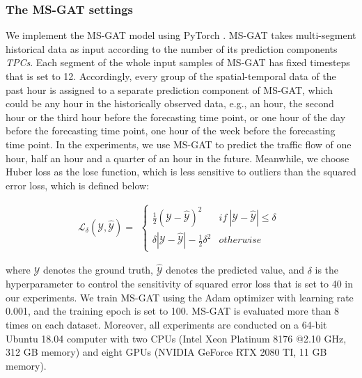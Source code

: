 \subsubsection{The MS-GAT settings}
We implement the MS-GAT model using PyTorch \cite{ketkar2017introduction}. MS-GAT takes multi-segment historical data as input according to the number of its prediction components  \textit{TPCs}. Each segment of the whole input samples of MS-GAT has fixed timesteps that is set to 12. Accordingly, every group of the spatial-temporal data of the past hour is assigned to a separate prediction component of MS-GAT, which could be any hour in the historically observed data, e.g., an hour, the second hour or the third hour before the forecasting time point, or one hour of the day before the forecasting time point, one hour of the week before the forecasting time point. In the experiments, we use MS-GAT to predict the traffic flow of one hour, half an hour and a quarter of an hour in the future. Meanwhile, we choose Huber loss \cite{huber1992robust} as the lose function, which is less sensitive to outliers than the squared error loss, which is defined below:

\begin{equation}
    \label{eqn:huber_loss}
    \mathcal{L}_{\delta}(\mathcal{Y}, \hat{\mathcal{Y}}) =
    \begin{aligned}
        \begin{cases}
            \frac{1}{2} \left ( \mathcal{Y} - \hat{\mathcal{Y}} \right ) ^2                 & if \ \left | \mathcal{Y} - \hat{\mathcal{Y}} \right | \leq \delta \\
            \delta \left | \mathcal{Y} - \hat{\mathcal{Y}} \right | - \frac{1}{2} \delta ^2 & otherwise
        \end{cases}
    \end{aligned}
\end{equation}

where $\mathcal{Y}$ denotes the ground truth, $\hat{\mathcal{Y}}$ denotes the predicted value, and $\delta$ is the hyperparameter to control the sensitivity of squared error loss that is set to 40 in our experiments.
We train MS-GAT using the Adam optimizer with learning rate 0.001, and the training epoch is set to 100. MS-GAT is evaluated more than 8 times on each dataset. Moreover, all experiments are conducted on a 64-bit Ubuntu 18.04 computer with two CPUs (Intel Xeon Platinum 8176 @2.10 GHz, 312 GB memory) and eight GPUs (NVIDIA GeForce RTX 2080 TI, 11 GB memory).

